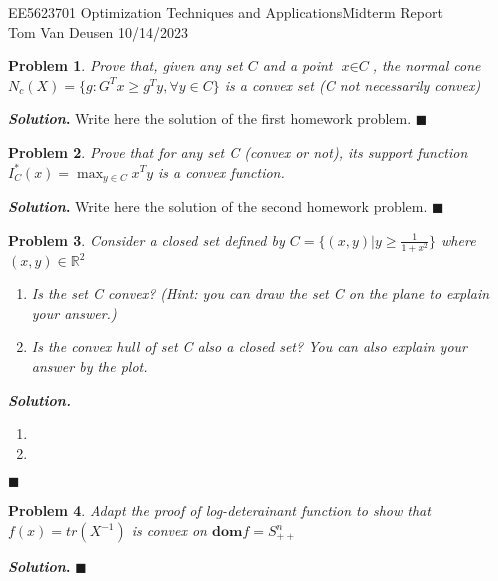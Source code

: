 \documentclass[12pt]{article}
\newtheorem{problem}{Problem}
\newenvironment{solution}[1][\textit{Solution}]{\textbf{#1. }}{$\blacksquare$}
\begin{document}
	\noindent EE5623701 Optimization Techniques and Applications\hfill Midterm Report\\
	Tom Van Deusen \hfill 10/14/2023

	\hrulefill

	\begin{problem}
    Prove that, given any set $\textit{C}$ and a point $\textit{x} \in \textit{C}$, the normal cone $N_c(X) = \{g: G^{T}x \geq g^{T}y, \forall y \in C\}$ is a convex set (C not necessarily convex)  
  \end{problem}
	\begin{solution}
		Write here the solution of the first homework problem.
	\end{solution}

	\begin{problem}
    Prove that for any set \textit{C} (convex or not), its support function $I_{C}^{*}(x) = \max_{y \in C} x^{T}y$ is a convex function.
	\end{problem}
	\begin{solution}
		Write here the solution of the second homework problem.
	\end{solution}

  \begin{problem}
    Consider a closed set defined by $C = \{(x,y) | y \geq \frac{1}{1 + x^2}\}$ where $(x,y) \in \mathbb{R}^{2}$
    \begin{enumerate}
      \item Is the set \it{C} convex? (Hint: you can draw the set \it{C} on the plane to explain your answer.) 
      \item  Is the convex hull of set \it{C} also a closed set? You can also explain your answer by the plot.
    \end{enumerate}
    \begin{solution}
      \begin{enumerate}
        \item 
        \item 
      \end{enumerate}
    \end{solution}
  \end{problem}

  \begin{problem}
    Adapt the proof of log-deterainant function to show that $f(x) = tr(X^{-1})$ is convex on $\textbf{dom}f = S^{n}_{++}$
      
    \end{problem}
  \begin{solution}
  \end{solution}
\end{document}
